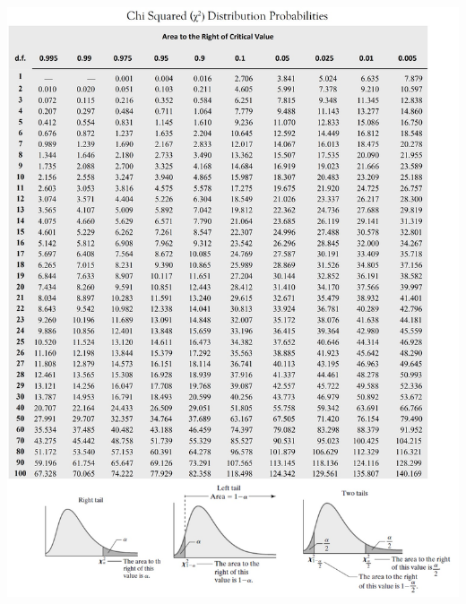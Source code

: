 \documentclass[12pt, landscape]{article}
\begin{document}
\begin{multicols*}{3}
\smallskip
\centerline{\includegraphics[width=0.7\linewidth]{chitable}}

\columnbreak


\end{multicols*}
\end{document}
